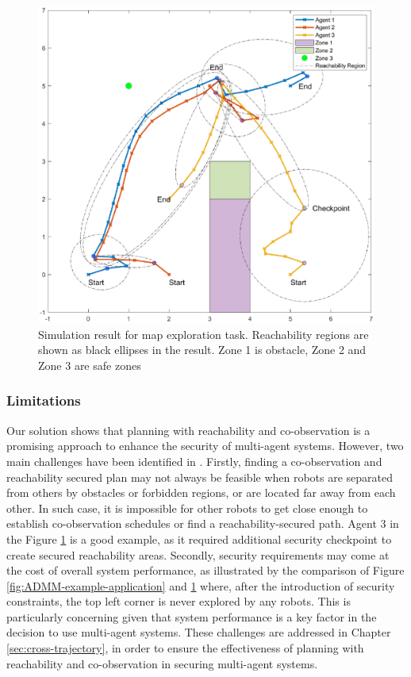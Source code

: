 \documentclass[journal]{IEEEtran}  %
\begin{document}
\begin{figure}[htbp]
\begin{center}
\includegraphics[width=0.6\linewidth]{FinalResult}
\caption{Simulation result for map exploration task. Reachability regions are shown as black ellipses in the result. Zone 1 is obstacle, Zone 2 and Zone 3 are safe zones}
\label{fig:ReachabilitySimulation}
\end{center}
\end{figure}

\subsubsection{Limitations}\label{sec:reachability-discussion}
Our solution shows that planning with reachability and co-observation is a promising approach to enhance the security of multi-agent systems. However, two main challenges have been identified in \cite{wardega2023hola}. Firstly, finding a co-observation and reachability secured plan may not always be feasible when robots are separated from others by obstacles or forbidden regions, or are located far away from each other. In such case, it is impossible for other robots to get close enough to establish co-observation schedules or find a reachability-secured path. Agent 3 in the Figure \ref{fig:ReachabilitySimulation} is a good example, as it required additional security checkpoint to create secured reachability areas. Secondly, security requirements may come at the cost of overall system performance, as illustrated by the comparison of Figure \ref{fig:ADMM-example-application} and \ref{fig:ReachabilitySimulation} where, after the introduction of security constraints, the top left corner is never explored by any robots. This is particularly concerning given that system performance is a key factor in the decision to use multi-agent systems. These challenges are addressed in Chapter \ref{sec:cross-trajectory}, in order to ensure the effectiveness of planning with reachability and co-observation in securing multi-agent systems.
\end{document}
